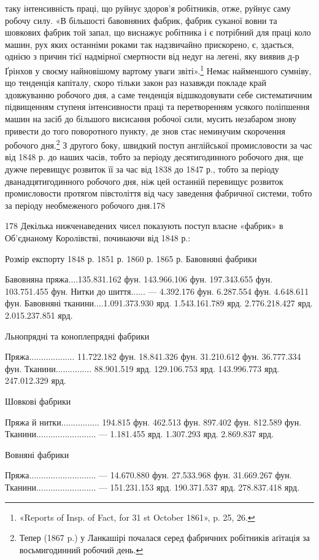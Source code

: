 таку інтенсивність праці, що руйнує здоров’я робітників, отже,
руйнує саму робочу силу. «В більшості бавовняних фабрик, фабрик
суканої вовни та шовкових фабрик той запал, що виснажує
робітника і є потрібний для праці коло машин, рух яких останніми
роками так надзвичайно прискорено, є, здається, однією
з причин тієї надмірної смертности від недуг на легені, яку виявив
д-р Ґрінхов у своєму найновішому вартому уваги звіті».\footnote{
«Reports of Insp. of Fact, for 31 st October 1861», p. 25, 26.
}
Немає найменшого сумніву, що тенденція капіталу, скоро тільки
закон раз назавжди покладе край здовжуванню робочого дня,
а саме тенденція відшкодовувати себе систематичним підвищенням
ступеня інтенсивности праці та перетворенням усякого поліпшення
машин на засіб до більшого висисання робочої сили, мусить
незабаром знову привести до того поворотного пункту, де знов
стає неминучим скорочення робочого дня.\footnote{
Тепер (1867 p.) у Ланкашірі почалася серед фабричних робітників
аґітація за восьмигодинний робочий день.
} З другого боку,
швидкий поступ англійської промисловости за час від 1848 р. до
наших часів, тобто за періоду десятигодинного робочого дня, ще
дужче перевищує розвиток її за час від 1838 до 1847 р., тобто за
періоду дванадцятигодинного робочого дня, ніж цей останній
перевищує розвиток промисловости протягом півстоліття від часу
заведення фабричної системи, тобто за періоду необмеженого
робочого дня.178

178    Декілька нижченаведених чисел показують поступ власне «фабрик»
в Об’єднаному Королівстві, починаючи від 1848 р.:

                                                                                        Розмір
експорту
                                                             1848 р.               1851 р.          
        1860 р.                 1865 р.
Бавовняні фабрики

Бавовняна пряжа....135.831.162 фун.   143.966.106 фун.  197.343.655 фун. 103.751.455 фун.
Нитки до шиття......                      —                 4.392.176 фун.    6.287.554 фун.   
4.648.611 фун.
Бавовняні тканини....1.091.373.930 ярд.  1.543.161.789 ярд.    2.776.218.427 ярд.    2.015.237.851
ярд.

Льнопрядні та коноплепрядні фабрики

Пряжа...................  11.722.182 фун.    18.841.326 фун.    31.210.612 фун.    36.777.334 фун.
Тканини...............  88.901.519 ярд.    129.106.753 ярд.    143.996.773 ярд.    247.012.329 ярд.

Шовкові фабрики

Пряжа й нитки................  194.815 фун.    462.513 фун.      897.402 фун.         812.589 фун.
Тканини.........................              —             1.181.455 ярд.    1.307.293 ярд.   
2.869.837 ярд.

Вовняні фабрики

Пряжа............................               —       14.670.880 фун.    27.533.968 фун.   
31.669.267 фун.
Тканини.........................              —     151.231.153 ярд.    190.371.537 ярд.   
278.837.418 ярд.
